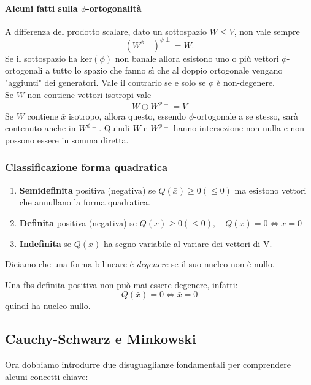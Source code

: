 \documentclass[x11names]{article}
\begin{document}
\paragraph{Alcuni fatti sulla $\phi$-ortogonalità} A differenza del prodotto scalare, dato un sottospazio $W \leq V$, non vale sempre
\[
\left(W^{\phi \perp}\right)^{\phi \perp} = W
.\]
Se il sottospazio ha $\text{ker}(\phi)$ non banale allora esistono uno o più vettori $\phi$-ortogonali a tutto lo spazio che fanno sì che al doppio ortogonale vengano "aggiunti" dei generatori. Vale il contrario se e solo se $\phi$ è non-degenere. \\

\noindent
Se $W$ non contiene vettori isotropi vale 
\[
W \oplus W^{\phi \perp} = V
\]
Se $W$ contiene $\bar{x}$ isotropo, allora questo, essendo $\phi$-ortogonale a se stesso, sarà contenuto anche in $W^{\phi \perp}$. Quindi $W$ e $W^{\phi \perp}$ hanno intersezione non nulla e non possono essere in somma diretta.


\subsubsection{Classificazione forma quadratica}
\begin{enumerate}
	\item \textbf{Semidefinita} positiva (negativa) se $Q(\bar{x}) \geq 0 (\leq 0)$ ma esistono vettori che annullano la forma quadratica.
	\item \textbf{Definita} positiva (negativa) se $Q(\bar{x}) \geq 0 (\leq 0), \quad Q(\bar{x}) = 0 \Longleftrightarrow \bar{x} = 0$
	\item \textbf{Indefinita} se $Q(\bar{x})$ ha segno variabile al variare dei vettori di V.
\end{enumerate}

\noindent
Diciamo che una forma bilineare è \textit{degenere} se il suo nucleo non è nullo.

Una fbs definita positiva non può mai essere degenere, infatti:
\[
Q(\bar{x}) = 0 \Longleftrightarrow \bar{x} = 0
\]
quindi ha nucleo nullo.

\subsection{Cauchy-Schwarz e Minkowski}
Ora dobbiamo introdurre due disuguaglianze fondamentali per comprendere alcuni concetti chiave:
\end{document}
